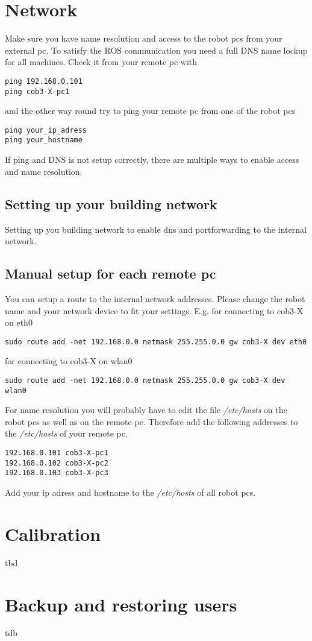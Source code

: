 \section{Network}
Make sure you have name resolution and access to the robot pcs from your external pc. To satisfy the ROS communication you need a full DNS name lockup for all machines. Check it from your remote pc with
\begin{lstlisting}
ping 192.168.0.101
ping cob3-X-pc1
\end{lstlisting}
and the other way round try to ping your remote pc from one of the robot pcs
\begin{lstlisting}
ping your_ip_adress
ping your_hostname
\end{lstlisting}

If ping and DNS is not setup correctly, there are multiple ways to enable access and name resolution.

\subsection{Setting up your building network}
Setting up you building network to enable dns and portforwarding to the internal network.

\subsection{Manual setup for each remote pc}
You can setup a route to the internal network addresses. Please change the robot name and your network device to fit your settings. E.g. for connecting to cob3-X on eth0
\begin{lstlisting}
sudo route add -net 192.168.0.0 netmask 255.255.0.0 gw cob3-X dev eth0
\end{lstlisting}

for connecting to cob3-X on wlan0
\begin{lstlisting}
sudo route add -net 192.168.0.0 netmask 255.255.0.0 gw cob3-X dev wlan0
\end{lstlisting}


For name resolution you will probably have to edit the file \textit{/etc/hosts} on the robot pcs as well as on the remote pc. Therefore add the following addresses to the \textit{/etc/hosts} of your remote pc.
\begin{lstlisting}
192.168.0.101 cob3-X-pc1
192.168.0.102 cob3-X-pc2
192.168.0.103 cob3-X-pc3
\end{lstlisting}

Add your ip adress and hostname to the \textit{/etc/hosts} of all robot pcs.

\section{Calibration}
tbd
\section{Backup and restoring users}   
tdb


